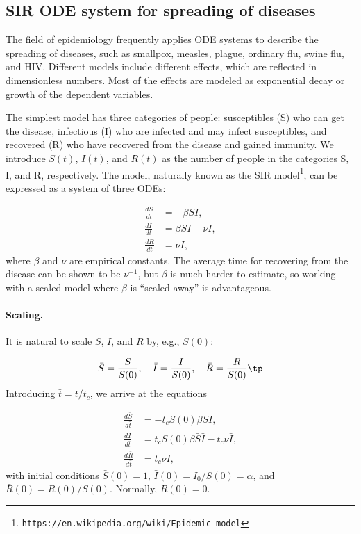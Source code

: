 \documentclass[graybox,envcountchap,sectrefs,final]{svmonodo}
\begin{document}
\subsection{SIR ODE system for spreading of diseases}

The field of epidemiology frequently applies ODE systems to describe
the spreading of diseases, such as smallpox, measles, plague, ordinary
flu, swine flu, and HIV. Different models include different effects,
which are reflected in dimensionless numbers. Most of the effects are
modeled as exponential decay or growth of the dependent variables.

The simplest model has three categories of people: susceptibles (S)
who can get the disease, infectious (I) who are infected and may
infect susceptibles, and recovered (R) who have recovered from the
disease and gained immunity. We introduce $S(t)$, $I(t)$, and $R(t)$
as the number of people in the categories S, I, and R, respectively.
The model, naturally known as the \href{{https://en.wikipedia.org/wiki/Epidemic_model}}{SIR model}\footnote{\texttt{https://en.wikipedia.org/wiki/Epidemic\_model}}, can be expressed as a
system of three ODEs:

\begin{align}
\frac{dS}{dt} &= - \beta SI,
\label{scale:SIR:S}\\ 
\frac{dI}{dt} &= \beta SI - \nu I,
\label{scale:SIR:I}\\ 
\frac{dR}{dt} &= \nu I,
\label{scale:SIR:R}
\end{align}
where $\beta$ and $\nu$ are empirical constants. The average time for recovering
from the disease can be shown to be $\nu^{-1}$, but $\beta$ is much harder
to estimate, so working with a scaled model where $\beta$ is ``scaled away''
is advantageous.

\paragraph{Scaling.}
It is natural to scale $S$, $I$, and $R$ by, e.g., $S(0)$:

\[ \bar S = \frac{S}{S(0)},\quad \bar I = \frac{I}{S(0)},\quad
\bar R = \frac{R}{S(0)}\tp
\]
Introducing $\bar t = t/t_c$, we arrive at the equations

\begin{align*}
\frac{d\bar S}{d\bar t} &= - t_c S(0) \beta\bar S\bar I,
\\ 
\frac{d\bar I}{d\bar t} &= t_c S(0) \beta \bar S\bar I - t_c \nu \bar I,
\\ 
\frac{d\bar R}{d\bar t} &= t_c \nu \bar I,
\end{align*}
with initial conditions $\bar S(0)=1$, $\bar I(0)=I_0/S(0)=\alpha$, and
$\bar R(0)=R(0)/S(0)$. Normally, $R(0)=0$.
\end{document}
